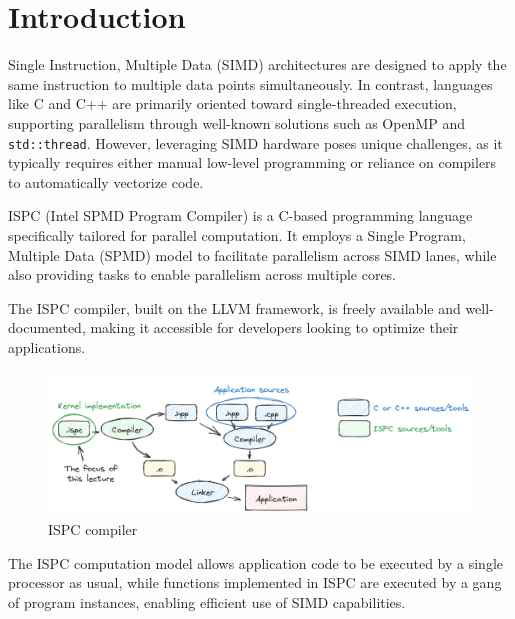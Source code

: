 \section{Introduction}

Single Instruction, Multiple Data (SIMD) architectures are designed to apply the same instruction to multiple data points simultaneously. 
In contrast, languages like C and C++ are primarily oriented toward single-threaded execution, supporting parallelism through well-known solutions such as OpenMP and \texttt{std::thread}. 
However, leveraging SIMD hardware poses unique challenges, as it typically requires either manual low-level programming or reliance on compilers to automatically vectorize code.

ISPC (Intel SPMD Program Compiler) is a C-based programming language specifically tailored for parallel computation. 
It employs a Single Program, Multiple Data (SPMD) model to facilitate parallelism across SIMD lanes, while also providing tasks to enable parallelism across multiple cores.

The ISPC compiler, built on the LLVM framework, is freely available and well-documented, making it accessible for developers looking to optimize their applications.
\begin{figure}[H]
    \centering
    \includegraphics[width=0.75\linewidth]{images/ispc.png}
    \caption{ISPC compiler}
\end{figure}
The ISPC computation model allows application code to be executed by a single processor as usual, while functions implemented in ISPC are executed by a gang of program instances, enabling efficient use of SIMD capabilities.